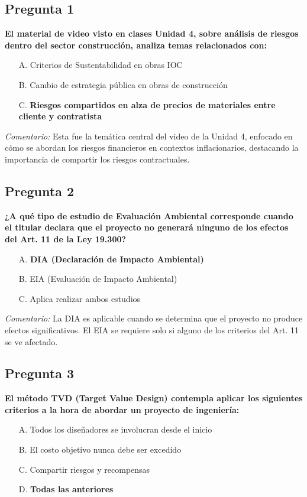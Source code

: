 \subsection*{Pregunta 1}
\textbf{El material de video visto en clases Unidad 4, sobre análisis de riesgos dentro del sector construcción, analiza temas relacionados con:}
\begin{itemize}
    \item[A.] Criterios de Sustentabilidad en obras IOC
    \item[B.] Cambio de estrategia pública en obras de construcción
    \item[C.] \textbf{Riesgos compartidos en alza de precios de materiales entre cliente y contratista}
\end{itemize}

\textit{Comentario:} Esta fue la temática central del video de la Unidad 4, enfocado en cómo se abordan los riesgos financieros en contextos inflacionarios, destacando la importancia de compartir los riesgos contractuales.

\subsection*{Pregunta 2}
\textbf{¿A qué tipo de estudio de Evaluación Ambiental corresponde cuando el titular declara que el proyecto no generará ninguno de los efectos del Art. 11 de la Ley 19.300?}
\begin{itemize}
    \item[A.] \textbf{DIA (Declaración de Impacto Ambiental)} 
    \item[B.] EIA (Evaluación de Impacto Ambiental)
    \item[C.] Aplica realizar ambos estudios
\end{itemize}

\textit{Comentario:} La DIA es aplicable cuando se determina que el proyecto no produce efectos significativos. El EIA se requiere solo si alguno de los criterios del Art. 11 se ve afectado.

\subsection*{Pregunta 3}
\textbf{El método TVD (Target Value Design) contempla aplicar los siguientes criterios a la hora de abordar un proyecto de ingeniería:}
\begin{itemize}
    \item[A.] Todos los diseñadores se involucran desde el inicio
    \item[B.] El costo objetivo nunca debe ser excedido
    \item[C.] Compartir riesgos y recompensas
    \item[D.] \textbf{Todas las anteriores} 
\end{itemize}

